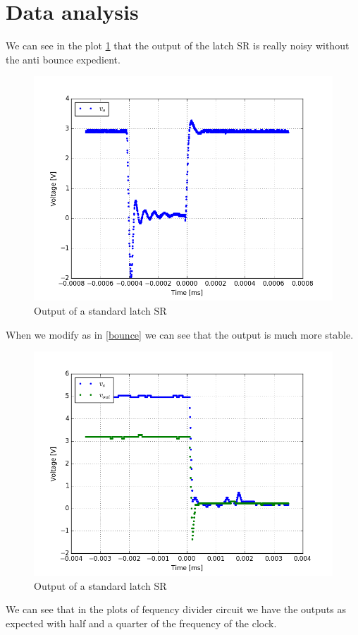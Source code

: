 \section{Data analysis}
We can see in the plot \ref{bounce_time} that the output of the latch SR is really noisy without the anti bounce expedient.
\begin{figure}[H]
\centering
\includegraphics[width=.7\textwidth]{11/bounce_time.png}
\caption{Output of a standard latch SR}\label{bounce_time}
\end{figure}
When we modify as in \ref{bounce} we can see that the output is much more stable.
\begin{figure}[H]
\centering
\includegraphics[width=.7\textwidth]{11/anti_bounce_time3.png}
\caption{Output of a standard latch SR}\label{anti_bounce_time3}
\end{figure}
We can see that in the plots of fequency divider circuit we have the outputs as expected with half and a quarter of the frequency of the clock.

